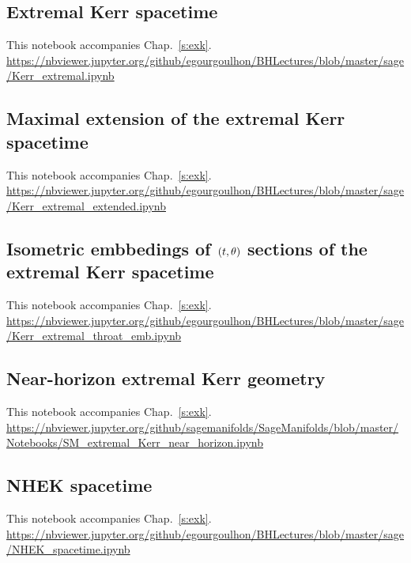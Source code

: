 \subsection{Extremal Kerr spacetime} \label{s:sam:Kerr_extremal}

This notebook accompanies Chap.~\ref{s:exk}.\\[1ex]
{\footnotesize
\url{https://nbviewer.jupyter.org/github/egourgoulhon/BHLectures/blob/master/sage/Kerr_extremal.ipynb}
}

\subsection{Maximal extension of the extremal Kerr spacetime} \label{s:sam:Kerr_extremal_extended}

This notebook accompanies Chap.~\ref{s:exk}.\\[1ex]
{\footnotesize
\url{https://nbviewer.jupyter.org/github/egourgoulhon/BHLectures/blob/master/sage/Kerr_extremal_extended.ipynb}
}

\subsection{Isometric embbedings of \texorpdfstring{$(t,\theta)$}{(t,θ)} sections of the extremal Kerr spacetime} \label{s:sam:Kerr_extremal_throat_emb}

This notebook accompanies Chap.~\ref{s:exk}.\\[1ex]
{\footnotesize
\url{https://nbviewer.jupyter.org/github/egourgoulhon/BHLectures/blob/master/sage/Kerr_extremal_throat_emb.ipynb}
}

\subsection{Near-horizon extremal Kerr geometry} \label{s:sam:NEHK}

This notebook accompanies Chap.~\ref{s:exk}.\\[1ex]
{\footnotesize
\url{https://nbviewer.jupyter.org/github/sagemanifolds/SageManifolds/blob/master/Notebooks/SM_extremal_Kerr_near_horizon.ipynb}
}

\subsection{NHEK spacetime} \label{s:sam:NEHK_spacetime}

This notebook accompanies Chap.~\ref{s:exk}.\\[1ex]
{\footnotesize
\url{https://nbviewer.jupyter.org/github/egourgoulhon/BHLectures/blob/master/sage/NHEK_spacetime.ipynb}
}



